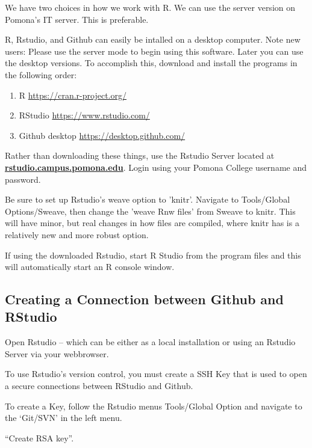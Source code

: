 \documentclass[12pt]{../SOP3_beta}
\begin{document}
\NP We have two choices in how we work with R. We can use the server version on Pomona's IT server. This is preferable. 

\NP R, Rstudio, and Github can easily be intalled on a desktop computer. Note new users: Please use the server mode to begin using this software. Later you can use the desktop versions. To accomplish this, download and install the programs in the following order: 

\begin{enumerate}
  \item R \url{https://cran.r-project.org/}
  \item RStudio \url{https://www.rstudio.com/}
  \item Github desktop \url{https://desktop.github.com/}
\end{enumerate}

\NP Rather than downloading these things, use the Rstudio Server located at \href{http://rstudio.campus.pomona.edu}{\textbf{rstudio.campus.pomona.edu}}. Login using your Pomona College username and password.

\NP Be sure to set up Rstudio's weave option to 'knitr'. Navigate to Tools/Global Options/Sweave, then change the 'weave Rnw files' from Sweave to knitr. This will have minor, but real changes in how files are compiled, where knitr has is a relatively new and more robust option.

\NP If using the downloaded Rstudio, start R Studio from the program files and this will automatically start an R console window.

\subsection{Creating a Connection between Github and RStudio}

\NP Open Rstudio -- which can be either as a local installation or using an Rstudio Server via your webbrowser.

\NP To use Rstudio's version control, you must create a SSH Key that is used to open a secure connections between RStudio and Github.

\NP To create a Key, follow the Rstudio menus Tools/Global Option and navigate to the `Git/SVN' in the left menu.

\NP ``Create RSA key''. 
\end{document}
